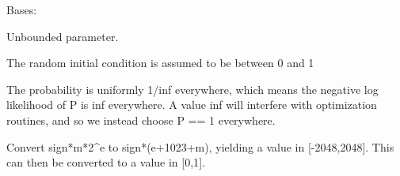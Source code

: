 \documentclass[letterpaper,10pt,english]{sphinxmanual}
\begin{document}
\begin{fulllineitems}
\label{api/mystic.bounds:refl1d.mystic.bounds.Unbounded}
Bases: 

Unbounded parameter.

The random initial condition is assumed to be between 0 and 1

The probability is uniformly 1/inf everywhere, which means the negative
log likelihood of P is inf everywhere.  A value inf will interfere
with optimization routines, and so we instead choose P == 1 everywhere.

Convert sign*m*2\textasciicircum{}e to sign*(e+1023+m), yielding a value in {[}-2048,2048{]}.
This can then be converted to a value in {[}0,1{]}.

\begin{fulllineitems}
\label{api/mystic.bounds:refl1d.mystic.bounds.Unbounded.get01}
\end{fulllineitems}


\begin{fulllineitems}
\label{api/mystic.bounds:refl1d.mystic.bounds.Unbounded.getfull}
\end{fulllineitems}


\begin{fulllineitems}
\label{api/mystic.bounds:refl1d.mystic.bounds.Unbounded.nllf}
\end{fulllineitems}


\begin{fulllineitems}
\label{api/mystic.bounds:refl1d.mystic.bounds.Unbounded.put01}
\end{fulllineitems}


\begin{fulllineitems}
\label{api/mystic.bounds:refl1d.mystic.bounds.Unbounded.putfull}
\end{fulllineitems}


\end{fulllineitems}
\end{document}
